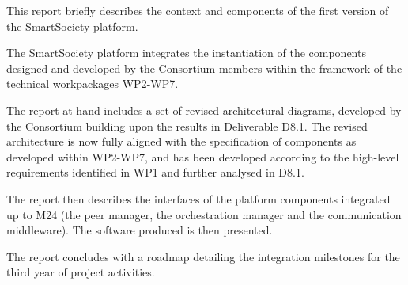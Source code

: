 This report briefly describes the context and components of the first version of the SmartSociety platform. 

The SmartSociety platform integrates the instantiation of the components designed and developed by the Consortium members within the framework of the technical workpackages WP2-WP7. 

The report at hand includes a set of revised architectural diagrams, developed by the Consortium building upon the results in Deliverable D8.1. The revised architecture is now fully aligned with the specification of components as developed within WP2-WP7, and has been developed according to the high-level requirements identified in WP1 and further analysed in D8.1.

The report then describes the interfaces of the platform components integrated up to M24 (the peer manager, the orchestration manager and the communication middleware). The software produced is then presented.

The report concludes with a roadmap detailing the integration milestones for the third year of project activities. 

